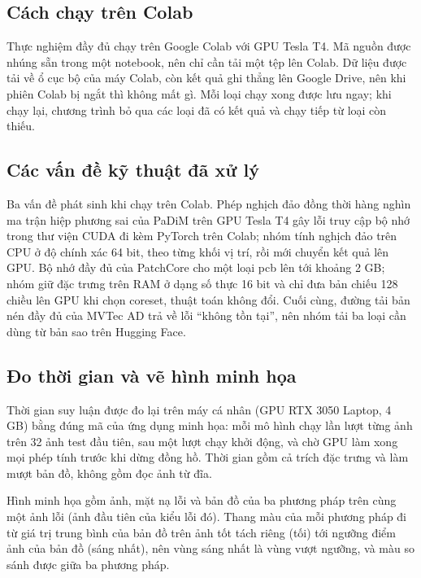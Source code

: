 \subsection{Cách chạy trên Colab}

Thực nghiệm đầy đủ chạy trên Google Colab với GPU Tesla T4. Mã nguồn được nhúng sẵn trong một notebook, nên chỉ cần
tải một tệp lên Colab. Dữ liệu được tải về ổ cục bộ của máy Colab, còn kết quả ghi thẳng lên Google Drive, nên khi
phiên Colab bị ngắt thì không mất gì. Mỗi loại chạy xong được lưu ngay; khi chạy lại, chương trình bỏ qua các loại đã
có kết quả và chạy tiếp từ loại còn thiếu.

\subsection{Các vấn đề kỹ thuật đã xử lý}

Ba vấn đề phát sinh khi chạy trên Colab. Phép nghịch đảo đồng thời hàng nghìn ma trận hiệp phương sai của PaDiM trên
GPU Tesla T4 gây lỗi truy cập bộ nhớ trong thư viện CUDA đi kèm PyTorch trên Colab; nhóm tính nghịch đảo trên CPU ở độ
chính xác 64 bit, theo từng khối vị trí, rồi mới chuyển kết quả lên GPU. Bộ nhớ đầy đủ của PatchCore cho một loại
pcb lên tới khoảng 2 GB; nhóm giữ đặc trưng trên RAM ở dạng số thực 16 bit và chỉ đưa bản chiếu 128 chiều lên GPU khi
chọn coreset, thuật toán không đổi. Cuối cùng, đường tải bản nén đầy đủ của MVTec AD trả về lỗi ``không tồn tại'',
nên nhóm tải ba loại cần dùng từ bản sao trên Hugging Face.

\subsection{Đo thời gian và vẽ hình minh họa}

Thời gian suy luận được đo lại trên máy cá nhân (GPU RTX 3050 Laptop, 4 GB) bằng đúng mã của ứng dụng minh họa:
mỗi mô hình chạy lần lượt từng ảnh trên 32 ảnh test đầu tiên, sau một lượt chạy khởi động, và chờ GPU làm xong mọi phép
tính trước khi dừng đồng hồ. Thời gian gồm cả trích đặc trưng và làm mượt bản đồ, không gồm đọc ảnh từ đĩa.

Hình minh họa gồm ảnh, mặt nạ lỗi và bản đồ của ba phương pháp trên cùng một ảnh lỗi (ảnh đầu tiên của kiểu lỗi đó).
Thang màu của mỗi phương pháp đi từ giá trị trung bình của bản đồ trên ảnh tốt tách riêng (tối) tới ngưỡng điểm ảnh
của bản đồ (sáng nhất), nên vùng sáng nhất là vùng vượt ngưỡng, và màu so sánh được giữa ba phương pháp.

